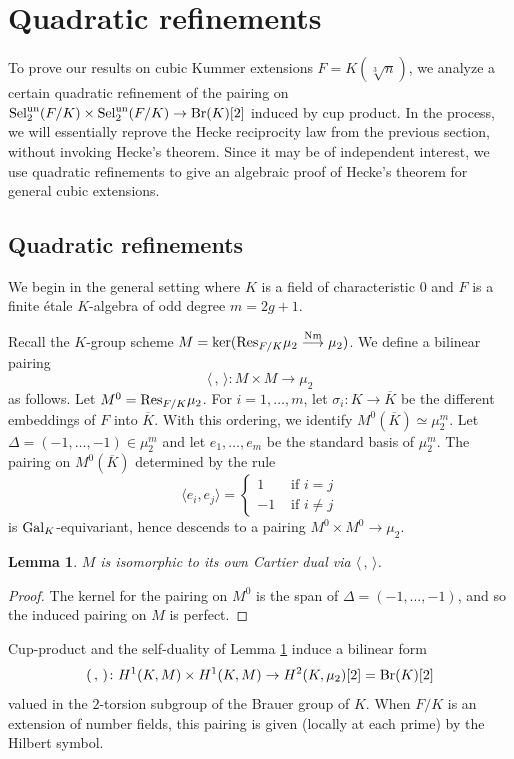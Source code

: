 \documentclass[11pt,a4paper]{amsart}
\def\Nm{{\rm Nm}}
\def\un{{\rm un}}
\def\Br{{\rm Br}}
\def\Res{{\rm Res}}
\def\Gal{{\rm Gal}}
\def\Sel{{\rm Sel}}
\numberwithin{equation}{section}
\newtheorem{lemma}[theorem]{Lemma}
\begin{document}
\section{Quadratic refinements}

To prove our results on cubic Kummer extensions $F = K(\sqrt[3]{n})$, we analyze a certain quadratic refinement of the pairing on $\Sel_2^\un(F/K) \times \Sel_2^\un(F/K) \to \Br(K)[2]$ induced by cup product. In the process, we will essentially reprove the Hecke reciprocity law from the previous section, without invoking Hecke's theorem. Since it may be of independent interest, we use quadratic refinements to give an algebraic proof of Hecke's theorem for general cubic extensions. 


\subsection{Quadratic refinements}\label{subsec: the obstruction map}
 We begin in the general setting where $K$ is a field of characteristic $0$ and $F$ is a finite \'etale $K$-algebra of odd degree $m = 2g+1$.
 
 
 Recall the $K$-group scheme $M = \ker(\Res_{F/K}\mu_2 \stackrel{\Nm}{\longrightarrow} \mu_2)$. We define a bilinear pairing 
 \[\langle \,  , \, \rangle \colon M \times M \to \mu_2\]
 as follows. Let $M^0 = \Res_{F/K}\mu_2$. For $i = 1, \ldots, m$, let $\sigma_i \colon K \to \overline{K}$ be the different embeddings of $F$ into $\overline{K}$. With this ordering, we identify $M^0(\overline{K}) \simeq \mu_2^m$. Let $\Delta = (-1,\ldots, -1) \in \mu_2^m$ and let $e_1, \ldots, e_m$ be the standard basis of $\mu_2^m$. The pairing on $M^0(\overline{K})$ determined by the rule 
 \[\langle e_i,e_j \rangle = \begin{cases} 1 & \mbox{ if $i = j$}\\
-1 & \mbox{ if $i \neq j$}
 \end{cases}
 \] is $\Gal_K$-equivariant, hence descends to a pairing $M^0 \times M^0 \to \mu_2$. 
 
\begin{lemma}\label{lem: self-dual}
    $M$ is isomorphic to its own Cartier dual via $\langle \, , \,  \rangle$.
\end{lemma}
\begin{proof}
    The kernel for the pairing on $M^0$ is the span of $\Delta = (-1,\ldots, -1)$, and so the induced pairing on $M$ is perfect. 
\end{proof}

Cup-product and the self-duality of Lemma \ref{lem: self-dual} induce a bilinear form 
\[( \, , \, ) \colon H^1(K, M) \times H^1(K,M) \to H^2(K, \mu_2)[2] = \Br(K)[2]\]
valued in the $2$-torsion subgroup of the Brauer group of $K$. When $F/K$ is an extension of number fields, this pairing is given (locally at each prime) by the Hilbert symbol. 
\end{document}
